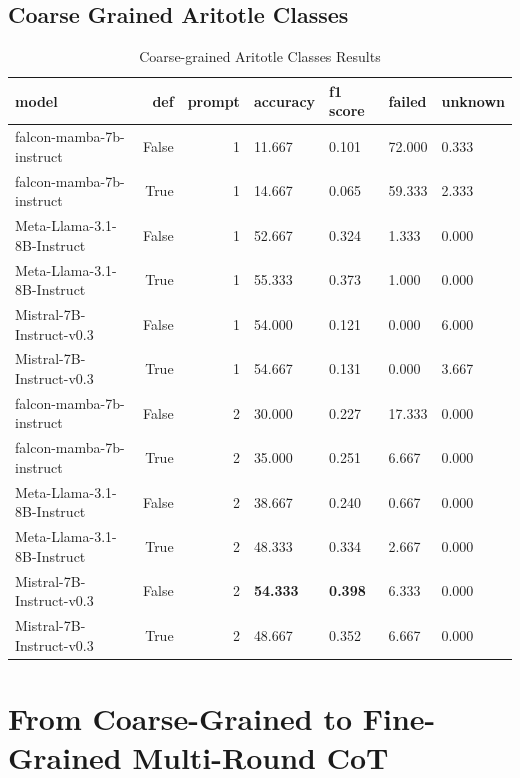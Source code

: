 \subsection{ Coarse Grained Aritotle Classes}
\begin{table}[H]
\centering
\caption{Coarse-grained Aritotle Classes Results}
\begin{tabular}{lrrllll}
\toprule
model & def & prompt & accuracy & f1 score & failed & unknown \\
\midrule
falcon-mamba-7b-instruct & False & 1 & 11.667 & 0.101 & 72.000 & 0.333 \\
falcon-mamba-7b-instruct & True & 1 & 14.667 & 0.065 & 59.333 & 2.333 \\
Meta-Llama-3.1-8B-Instruct & False & 1 & 52.667 & 0.324 & 1.333 & 0.000 \\
Meta-Llama-3.1-8B-Instruct & True & 1 & 55.333 & 0.373 & 1.000 & 0.000 \\
Mistral-7B-Instruct-v0.3 & False & 1 & 54.000 & 0.121 & 0.000 & 6.000 \\
Mistral-7B-Instruct-v0.3 & True & 1 & 54.667 & 0.131 & 0.000 & 3.667 \\
falcon-mamba-7b-instruct & False & 2 & 30.000 & 0.227 & 17.333 & 0.000 \\
falcon-mamba-7b-instruct & True & 2 & 35.000 & 0.251 & 6.667 & 0.000 \\
Meta-Llama-3.1-8B-Instruct & False & 2 & 38.667 & 0.240 & 0.667 & 0.000 \\
Meta-Llama-3.1-8B-Instruct & True & 2 & 48.333 & 0.334 & 2.667 & 0.000 \\
Mistral-7B-Instruct-v0.3 & False & 2 & \textbf{54.333} & \textbf{0.398} & 6.333 & 0.000 \\
Mistral-7B-Instruct-v0.3 & True & 2 & 48.667 & 0.352 & 6.667 & 0.000 \\
\bottomrule
\end{tabular}
\end{table}


\section{From Coarse-Grained to Fine-Grained Multi-Round CoT }






